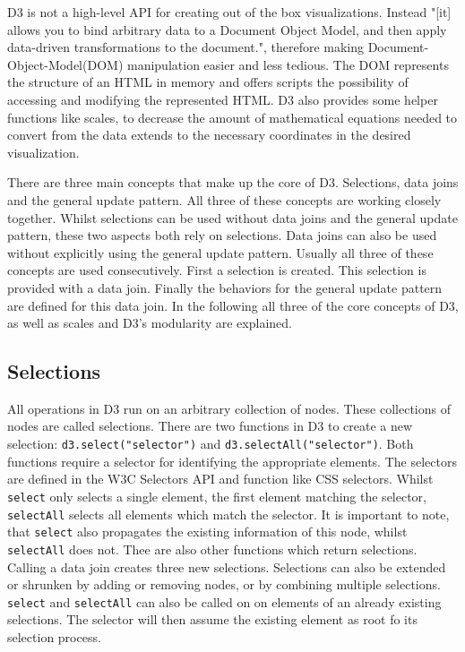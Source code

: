 D3 is not a high-level API for creating out of the box visualizations. Instead "[it] allows you to bind arbitrary data to a Document Object Model, and then apply data-driven transformations to the document."\cite{d3js}, therefore making Document-Object-Model(DOM) manipulation easier and less tedious. The DOM represents the structure of an HTML in memory and offers scripts the possibility of accessing and modifying the represented HTML. D3 also provides some helper functions like scales, to decrease the amount of mathematical equations needed to convert from the data extends to the necessary coordinates in the desired visualization.

There are three main concepts that make up the core of D3. Selections, data joins and the general update pattern. All three of these concepts are working closely together. Whilst selections can be used without data joins and the general update pattern, these two aspects both rely on selections. Data joins can also be used without explicitly using the general update pattern. Usually all three of these concepts are used consecutively. First a selection is created. This selection is provided with a data join. Finally the behaviors for the general update pattern are defined for this data join.
In the following all three of the core concepts of D3, as well as scales and D3's modularity are explained.

\subsection{Selections}

All operations in D3 run on an arbitrary collection of nodes. These collections of nodes are called selections. There are two functions in D3 to create a new selection: \verb|d3.select("selector")| and \verb|d3.selectAll("selector")|. Both functions require a selector for identifying the appropriate elements. The selectors are defined in the W3C Selectors API\cite{w3c_selectors_api} and function like CSS selectors. Whilst \verb|select| only selects a single element, the first element matching the selector, \verb|selectAll| selects all elements which match the selector. It is important to note, that \verb|select| also propagates the existing information of this node, whilst \verb|selectAll| does not. Thee are also other functions which return selections. Calling a data join creates three new selections. Selections can also be extended or shrunken by adding or removing nodes, or by combining multiple selections. \verb|select| and \verb|selectAll| can also be called on on elements of an already existing selections. The selector will then assume the existing element as root fo its selection process.

